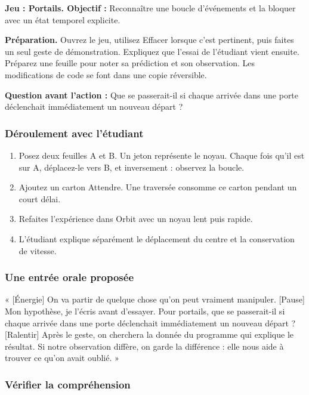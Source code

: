 \documentclass[
  canadien,
  11pt,
  letterpaper,
]{article}
\providecommand{\tightlist}{%
  \setlength{\itemsep}{0pt}\setlength{\parskip}{0pt}}
\begin{document}
\textbf{Jeu : Portails. Objectif :} Reconnaître une boucle d'événements
et la bloquer avec un état temporel explicite.

\textbf{Préparation.} Ouvrez le jeu, utilisez Effacer lorsque c'est
pertinent, puis faites un seul geste de démonstration. Expliquez que
l'essai de l'étudiant vient ensuite. Préparez une feuille pour noter sa
prédiction et son observation. Les modifications de code se font dans
une copie réversible.

\textbf{Question avant l'action :} Que se passerait-il si chaque arrivée
dans une porte déclenchait immédiatement un nouveau départ ?

\subsubsection{Déroulement avec
l'étudiant}\label{duxe9roulement-avec-luxe9tudiant-9}

\begin{enumerate}
\def\labelenumi{\arabic{enumi}.}
\tightlist
\item
  Posez deux feuilles A et B. Un jeton représente le noyau. Chaque fois
  qu'il est sur A, déplacez-le vers B, et inversement : observez la
  boucle.
\item
  Ajoutez un carton Attendre. Une traversée consomme ce carton pendant
  un court délai.
\item
  Refaites l'expérience dans Orbit avec un noyau lent puis rapide.
\item
  L'étudiant explique séparément le déplacement du centre et la
  conservation de vitesse.
\end{enumerate}

\subsubsection{Une entrée orale
proposée}\label{une-entruxe9e-orale-proposuxe9e-9}

« {[}Énergie{]} On va partir de quelque chose qu'on peut vraiment
manipuler. {[}Pause{]} Mon hypothèse, je l'écris avant d'essayer. Pour
portails, que se passerait-il si chaque arrivée dans une porte
déclenchait immédiatement un nouveau départ ? {[}Ralentir{]} Après le
geste, on cherchera la donnée du programme qui explique le résultat. Si
notre observation diffère, on garde la différence : elle nous aide à
trouver ce qu'on avait oublié. »

\subsubsection{Vérifier la
compréhension}\label{vuxe9rifier-la-compruxe9hension-9}
\end{document}
